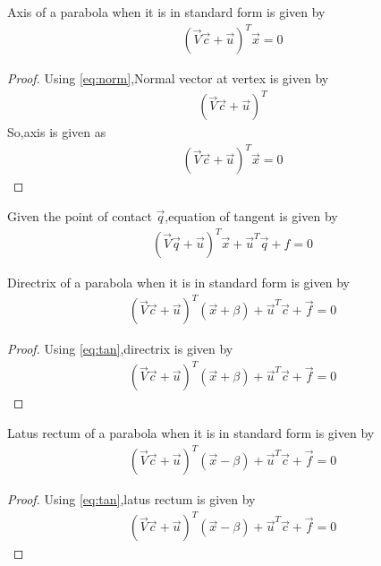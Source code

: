 \documentclass[journal,12pt,twocolumn]{IEEEtran}
\begin{document}
\begin{lemma}
Axis of a parabola when it is in standard form is given by
\begin{align}
(\vec{V}\vec{c}+\vec{u})^{T}\vec{x} = 0 \label{eq:axis}
\end{align}
\end{lemma}

\begin{proof}
Using \eqref{eq:norm},Normal vector at vertex is given by 
\begin{align}
    (\vec{V}\vec{c} + \vec{u})^T
\end{align}
So,axis is given as 
\begin{align}
    (\vec{V}\vec{c}+\vec{u})^{T}\vec{x} = 0
\end{align}
\end{proof}

\begin{lemma}
Given the point of contact $\vec{q}$,equation of tangent is given by
\begin{align}
    (\vec{V}\vec{q} + \vec{u})^T\vec{x} + \vec{u}^T\vec{q} + f = 0 \label{eq:tan}
\end{align}
\end{lemma}

\begin{lemma}
Directrix of a parabola when it is in standard form is given by
\begin{align}
(\vec{V}\vec{c}+\vec{u})^T(\vec{x} +\beta) + \vec{u}^T\vec{c} + \vec{f} = 0 \label{eq:directrix}
\end{align}
\end{lemma}

\begin{proof}
Using \eqref{eq:tan},directrix is given by
\begin{align}
    (\vec{V}\vec{c}+\vec{u})^T(\vec{x} +\beta) + \vec{u}^T\vec{c} + \vec{f} = 0
\end{align}
\end{proof}

\begin{lemma}
Latus rectum of a parabola when it is in standard form is given by 
\begin{align}
(\vec{V}\vec{c}+\vec{u})^T(\vec{x} -\beta) + \vec{u}^T\vec{c} + \vec{f} = 0 \label{eq:latus}
\end{align}
\end{lemma}

\begin{proof}
Using \eqref{eq:tan},latus rectum is given by
\begin{align}
(\vec{V}\vec{c}+\vec{u})^T(\vec{x} -\beta) + \vec{u}^T\vec{c} + \vec{f} = 0
\end{align}
\end{proof}
\end{document}
